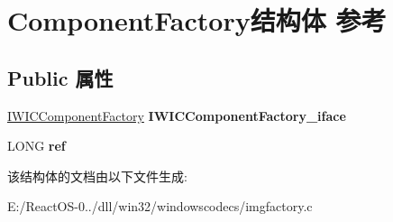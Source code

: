 \hypertarget{struct_component_factory}{}\section{Component\+Factory结构体 参考}
\label{struct_component_factory}
\subsection*{Public 属性}
\begin{DoxyCompactItemize}
\item 
\mbox{\label{struct_component_factory_a14ea57980a02aadd7bca7bb78f6fc201}} 
\hyperlink{interface_i_w_i_c_component_factory}{I\+W\+I\+C\+Component\+Factory} {\bfseries I\+W\+I\+C\+Component\+Factory\+\_\+iface}
\item 
\mbox{\label{struct_component_factory_afeb4ce894d6da952a64d5314bfb64975}} 
L\+O\+NG {\bfseries ref}
\end{DoxyCompactItemize}


该结构体的文档由以下文件生成\+:\begin{DoxyCompactItemize}
\item 
E\+:/\+React\+O\+S-\/0../dll/win32/windowscodecs/imgfactory.\+c\end{DoxyCompactItemize}
